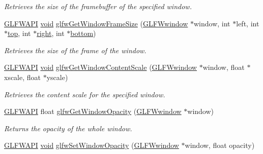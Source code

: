 \begin{DoxyCompactItemize}
\begin{DoxyCompactList}\small\item\em Retrieves the size of the framebuffer of the specified window. \end{DoxyCompactList}\item 
\mbox{\hyperlink{glfw3_8h_a56da5036b2cc259351ae22fd6439bb47}{G\+L\+F\+W\+A\+PI}} \mbox{\hyperlink{glad_8h_a950fc91edb4504f62f1c577bf4727c29}{void}} \mbox{\hyperlink{group__window_gaad46cdaae2eb732f68d3a1499a7c5409}{glfw\+Get\+Window\+Frame\+Size}} (\mbox{\hyperlink{group__window_ga3c96d80d363e67d13a41b5d1821f3242}{G\+L\+F\+Wwindow}} $\ast$window, int $\ast$left, int $\ast$\mbox{\hyperlink{glad_8h_ae78295170773f8782029afc65913897a}{top}}, int $\ast$\mbox{\hyperlink{glad_8h_ab412e67df941b4600c352b0b9e76d2ee}{right}}, int $\ast$\mbox{\hyperlink{glad_8h_a8f1e84df0c183c8fd701618316c9e280}{bottom}})
\begin{DoxyCompactList}\small\item\em Retrieves the size of the frame of the window. \end{DoxyCompactList}\item 
\mbox{\hyperlink{glfw3_8h_a56da5036b2cc259351ae22fd6439bb47}{G\+L\+F\+W\+A\+PI}} \mbox{\hyperlink{glad_8h_a950fc91edb4504f62f1c577bf4727c29}{void}} \mbox{\hyperlink{group__window_ga72718c983a9fffaa27f786bfe7d1c9ee}{glfw\+Get\+Window\+Content\+Scale}} (\mbox{\hyperlink{group__window_ga3c96d80d363e67d13a41b5d1821f3242}{G\+L\+F\+Wwindow}} $\ast$window, float $\ast$xscale, float $\ast$yscale)
\begin{DoxyCompactList}\small\item\em Retrieves the content scale for the specified window. \end{DoxyCompactList}\item 
\mbox{\hyperlink{glfw3_8h_a56da5036b2cc259351ae22fd6439bb47}{G\+L\+F\+W\+A\+PI}} float \mbox{\hyperlink{group__window_gad124d57a1c1c519f60c9765cd0c2a89c}{glfw\+Get\+Window\+Opacity}} (\mbox{\hyperlink{group__window_ga3c96d80d363e67d13a41b5d1821f3242}{G\+L\+F\+Wwindow}} $\ast$window)
\begin{DoxyCompactList}\small\item\em Returns the opacity of the whole window. \end{DoxyCompactList}\item 
\mbox{\hyperlink{glfw3_8h_a56da5036b2cc259351ae22fd6439bb47}{G\+L\+F\+W\+A\+PI}} \mbox{\hyperlink{glad_8h_a950fc91edb4504f62f1c577bf4727c29}{void}} \mbox{\hyperlink{group__window_ga62a784fe328f227727cbcd0d07480ff3}{glfw\+Set\+Window\+Opacity}} (\mbox{\hyperlink{group__window_ga3c96d80d363e67d13a41b5d1821f3242}{G\+L\+F\+Wwindow}} $\ast$window, float opacity)

\end{DoxyCompactItemize}
